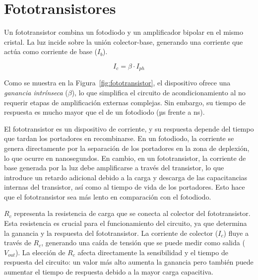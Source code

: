 


\section{Fototransistores}\label{sec:fototransistores}


Un fototransistor combina un fotodiodo y un amplificador bipolar en el mismo cristal. La luz incide sobre la unión colector-base, generando una corriente que actúa como corriente de base ($I_b$).

\begin{equation}
    I_c = \beta \cdot I_{ph}
\end{equation}

Como se muestra en la Figura~\ref{fig:fototransistor}, el dispositivo ofrece una \emph{ganancia intrínseca} ($\beta$), lo que simplifica el circuito de acondicionamiento al no requerir etapas de amplificación externas complejas. Sin embargo, su tiempo de respuesta es mucho mayor que el de un fotodiodo (µs frente a ns).

El fototransistor es un dispositivo de corriente, y su respuesta depende del tiempo que tardan los portadores en recombinarse. En un fotodiodo, la corriente se genera directamente por la separación de los portadores en la zona de deplexión, lo que ocurre en nanosegundos. En cambio, en un fototransistor, la corriente de base generada por la luz debe amplificarse a través del transistor, lo que introduce un retardo adicional debido a la carga y descarga de las capacitancias internas del transistor, así como al tiempo de vida de los portadores. Esto hace que el fototransistor sea más lento en comparación con el fotodiodo.

$R_c$ representa la resistencia de carga que se conecta al colector del fototransistor. Esta resistencia es crucial para el funcionamiento del circuito, ya que determina la ganancia y la respuesta del fototransistor. La corriente de colector ($I_c$) fluye a través de $R_c$, generando una caída de tensión que se puede medir como salida ($V_{out}$). La elección de $R_c$ afecta directamente la sensibilidad y el tiempo de respuesta del circuito: un valor más alto aumenta la ganancia pero también puede aumentar el tiempo de respuesta debido a la mayor carga capacitiva. 

